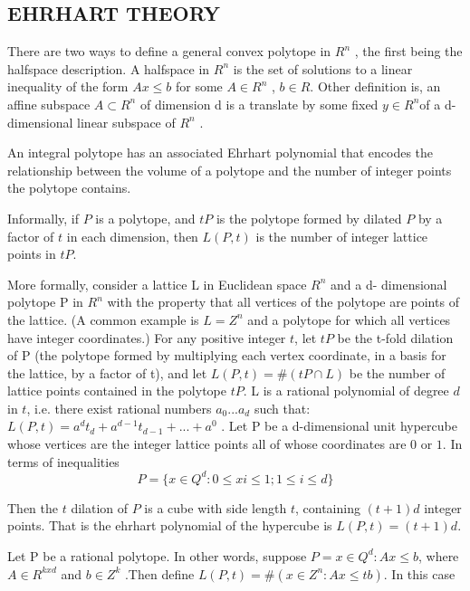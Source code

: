\documentclass[12pt,twoside]{article}
\begin{document}
\subsection{EHRHART THEORY}


There are two ways to define a general convex polytope in $R^n$ , the first being
the halfspace description. A halfspace in $R^n$ is the set of solutions to a linear
inequality of the form $Ax \leq b$ for some $A \in R^n$ , $b \in R$. Other definition is, an affine
subspace $A \subset R^n$ of dimension d is a translate by some fixed $y \in R^n $of a d-dimensional linear subspace of $R^n$ .\newline 
\par
An integral polytope has an associated Ehrhart polynomial that encodes the
relationship between the volume of a polytope and the number of integer points the
polytope contains.\newline
\par
Informally, if $P$ is a polytope, and $tP$ is the polytope formed by dilated $P$ by a
factor of $t$ in each dimension, then $L(P, t)$ is the number of integer lattice points in $tP$.\newline
\par
More formally, consider a lattice L in Euclidean space $R^n$ and a d-
dimensional polytope P in $R^n$ with the property that all vertices of the polytope are points of the lattice. (A common example is $L=Z^n$ and a polytope for which all
vertices have integer coordinates.) For any positive integer $t$, let $tP$ be the t-fold dilation of P (the polytope formed by multiplying each vertex coordinate, in a basis for the lattice, by a factor of t), and let $ L(P,t) = \#(tP \cap L)$ be the number of lattice
points contained in the polytope $tP$. L is a rational polynomial of degree $d$ in $t$, i.e. there exist rational numbers $a_0 ... a_d$ such that: $L(P,t) = a^dt_d + a^{d-1}t_{d-1} + ... + a^0$ . Let
P be a d-dimensional unit hypercube whose vertices are the integer lattice points all
of whose coordinates are $0$ or $1$. In terms of inequalities
\[ P = \{ x \in Q^d : 0 \leq x i \leq 1; 1 \leq i \leq d \} \]
\newpage
\par
Then the $t$ dilation of $P$ is a cube with side length $t$, containing $ (t+1) d$
integer points. That is the ehrhart polynomial of the hypercube is $ L(P,t) = (t + 1) d$.
\newline
\par
Let P be a rational polytope. In other words, suppose $P = { x \in Q^d : Ax \leq b}$,
where $A \in R^{kxd}$ and $b \in Z^k$ .Then define $L(P,t) = \#({x \in Z^n : Ax \leq tb})$. In this case
\end{document}
